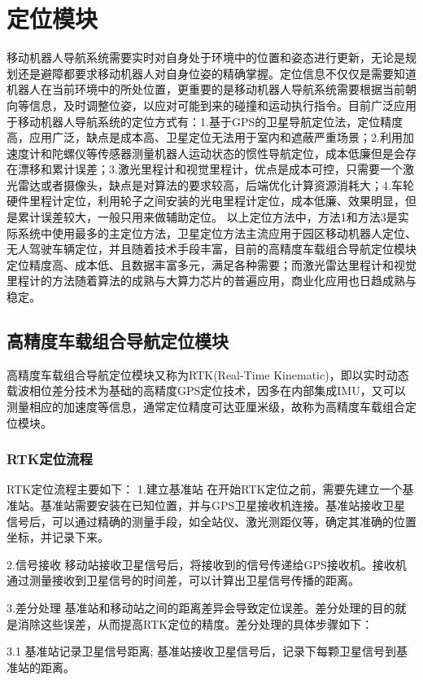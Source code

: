 \section{定位模块}
移动机器人导航系统需要实时对自身处于环境中的位置和姿态进行更新，无论是规划还是避障都要求移动机器人对自身位姿的精确掌握。定位信息不仅仅是需要知道机器人在当前环境中的所处位置，更重要的是移动机器人导航系统需要根据当前朝向等信息，及时调整位姿，以应对可能到来的碰撞和运动执行指令。目前广泛应用于移动机器人导航系统的定位方式有：1.基于GPS的卫星导航定位法，定位精度高，应用广泛，缺点是成本高、卫星定位无法用于室内和遮蔽严重场景；2.利用加速度计和陀螺仪等传感器测量机器人运动状态的惯性导航定位，成本低廉但是会存在漂移和累计误差；3.激光里程计和视觉里程计，优点是成本可控，只需要一个激光雷达或者摄像头，缺点是对算法的要求较高，后端优化计算资源消耗大；4.车轮硬件里程计定位，利用轮子之间安装的光电里程计定位，成本低廉、效果明显，但是累计误差较大，一般只用来做辅助定位。
以上定位方法中，方法1和方法3是实际系统中使用最多的主定位方法，卫星定位方法主流应用于园区移动机器人定位、无人驾驶车辆定位，并且随着技术手段丰富，目前的高精度车载组合导航定位模块定位精度高、成本低、且数据丰富多元，满足各种需要；而激光雷达里程计和视觉里程计的方法随着算法的成熟与大算力芯片的普遍应用，商业化应用也日趋成熟与稳定。

\subsection{高精度车载组合导航定位模块}
高精度车载组合导航定位模块又称为RTK(Real-Time Kinematic)，即以实时动态载波相位差分技术为基础的高精度GPS定位技术，因多在内部集成IMU，又可以测量相应的加速度等信息，通常定位精度可达亚厘米级，故称为高精度车载组合定位模块。

\subsubsection{RTK定位流程}
RTK定位流程主要如下：
1.建立基准站
在开始RTK定位之前，需要先建立一个基准站。基准站需要安装在已知位置，并与GPS卫星接收机连接。基准站接收卫星信号后，可以通过精确的测量手段，如全站仪、激光测距仪等，确定其准确的位置坐标，并记录下来。

2.信号接收
移动站接收卫星信号后，将接收到的信号传递给GPS接收机。接收机通过测量接收到卫星信号的时间差，可以计算出卫星信号传播的距离。

3.差分处理
基准站和移动站之间的距离差异会导致定位误差。差分处理的目的就是消除这些误差，从而提高RTK定位的精度。差分处理的具体步骤如下：

3.1 基准站记录卫星信号距离;
基准站接收卫星信号后，记录下每颗卫星信号到基准站的距离。

